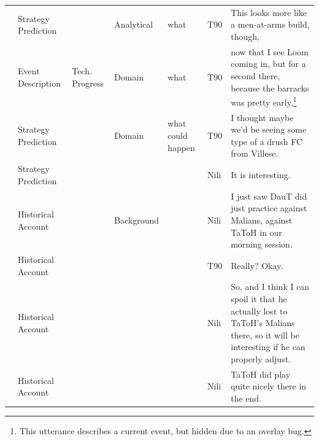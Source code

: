 {\begin{longtable}{@{}>{\theAppRow}r|L{2.3cm}L{2.2cm}L{1.4cm}L{2.2cm}L{0.5cm}U{5.6cm}@{}}
    & Strategy Prediction   &                      & Analytical  & what              & T90     & This looks more like a men-at-arms build, though,                                                                                                                                                                        \\
    & Event Description     & Tech. Progress       & Domain      & what              & T90     & now that I see Loom coming in, but for a second there, because the barracks was pretty early,\footnote{This utterance describes a current event, but hidden due to an overlay bug.}                                                                                                                            \\
    & Strategy Prediction   &                      & Domain      & what could happen & T90     & I thought maybe we'd be seeing some type of a drush FC from Villese.                                                                                                                                                     \\
    & Strategy Prediction   &                      &             &                   & Nili    & It is interesting.                                                                                                                                                                                                       \\
    & Historical Account    &                      & Background  &                   & Nili    & I just saw DauT did just practice against Malians, against TaToH in our morning session.                                                                                                                                 \\
    & Historical Account    &                      &             &                   & T90     & Really? Okay.                                                                                                                                                                                                            \\
    & Historical Account    &                      &             &                   & Nili    & So, and I think I can spoil it that he actually lost to TaToH's Malians there, so it will be interesting if he can properly adjust.                                                                                      \\
    & Historical Account    &                      &             &                   & Nili    & TaToH did play quite nicely there in the end.                                                                                                                                                                            \\

\end{longtable}}
